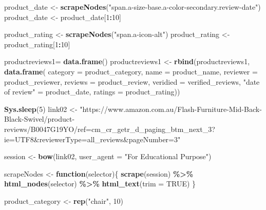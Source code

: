 \documentclass[
]{article}
\newenvironment{Shaded}{\begin{snugshade}}{\end{snugshade}}
\newcommand{\AttributeTok}[1]{\textcolor[rgb]{0.13,0.29,0.53}{#1}}
\newcommand{\ConstantTok}[1]{\textcolor[rgb]{0.56,0.35,0.01}{#1}}
\newcommand{\ControlFlowTok}[1]{\textcolor[rgb]{0.13,0.29,0.53}{\textbf{#1}}}
\newcommand{\DecValTok}[1]{\textcolor[rgb]{0.00,0.00,0.81}{#1}}
\newcommand{\FunctionTok}[1]{\textcolor[rgb]{0.13,0.29,0.53}{\textbf{#1}}}
\newcommand{\NormalTok}[1]{#1}
\newcommand{\OtherTok}[1]{\textcolor[rgb]{0.56,0.35,0.01}{#1}}
\newcommand{\SpecialCharTok}[1]{\textcolor[rgb]{0.81,0.36,0.00}{\textbf{#1}}}
\newcommand{\StringTok}[1]{\textcolor[rgb]{0.31,0.60,0.02}{#1}}
\begin{document}
\begin{Shaded}
\begin{Highlighting}[]
\NormalTok{  product\_date }\OtherTok{\textless{}{-}} \FunctionTok{scrapeNodes}\NormalTok{(}\StringTok{"span.a{-}size{-}base.a{-}color{-}secondary.review{-}date"}\NormalTok{)}
\NormalTok{  product\_date }\OtherTok{\textless{}{-}}\NormalTok{ product\_date[}\DecValTok{1}\SpecialCharTok{:}\DecValTok{10}\NormalTok{]}
  
\NormalTok{  product\_rating }\OtherTok{\textless{}{-}} \FunctionTok{scrapeNodes}\NormalTok{(}\StringTok{"span.a{-}icon{-}alt"}\NormalTok{)}
\NormalTok{  product\_rating }\OtherTok{\textless{}{-}}\NormalTok{ product\_rating[}\DecValTok{1}\SpecialCharTok{:}\DecValTok{10}\NormalTok{]}
  
\NormalTok{  productreviews1}\OtherTok{=} \FunctionTok{data.frame}\NormalTok{()}
\NormalTok{  productreviews1 }\OtherTok{\textless{}{-}} \FunctionTok{rbind}\NormalTok{(productreviews1, }\FunctionTok{data.frame}\NormalTok{(}
                      \AttributeTok{category =}\NormalTok{ product\_category,}
                      \AttributeTok{name =}\NormalTok{ product\_name,}
                      \AttributeTok{reviewer =}\NormalTok{ product\_reviewer,}
                      \AttributeTok{reviews =}\NormalTok{ product\_review,}
                      \AttributeTok{veridied =}\NormalTok{ verified\_reviews,}
                      \StringTok{"date of review"} \OtherTok{=}\NormalTok{ product\_date,}
                      \AttributeTok{ratings =}\NormalTok{ product\_rating))}

  
 \FunctionTok{Sys.sleep}\NormalTok{(}\DecValTok{5}\NormalTok{)}
\NormalTok{link02 }\OtherTok{\textless{}{-}} \StringTok{"https://www.amazon.com.au/Flash{-}Furniture{-}Mid{-}Back{-}Black{-}Swivel/product{-}reviews/B0047G19YO/ref=cm\_cr\_getr\_d\_paging\_btm\_next\_3?ie=UTF8\&reviewerType=all\_reviews\&pageNumber=3"}


\NormalTok{  session }\OtherTok{\textless{}{-}} \FunctionTok{bow}\NormalTok{(link02,}
               \AttributeTok{user\_agent =} \StringTok{"For Educational Purpose"}\NormalTok{)}

\NormalTok{  scrapeNodes }\OtherTok{\textless{}{-}} \ControlFlowTok{function}\NormalTok{(selector)\{}
    \FunctionTok{scrape}\NormalTok{(session) }\SpecialCharTok{\%\textgreater{}\%}
      \FunctionTok{html\_nodes}\NormalTok{(selector) }\SpecialCharTok{\%\textgreater{}\%}
      \FunctionTok{html\_text}\NormalTok{(}\AttributeTok{trim =} \ConstantTok{TRUE}\NormalTok{)}
\NormalTok{  \}}

\NormalTok{  product\_category }\OtherTok{\textless{}{-}} \FunctionTok{rep}\NormalTok{(}\StringTok{"chair"}\NormalTok{, }\DecValTok{10}\NormalTok{)}


\end{Highlighting}
\end{Shaded}
\end{document}
